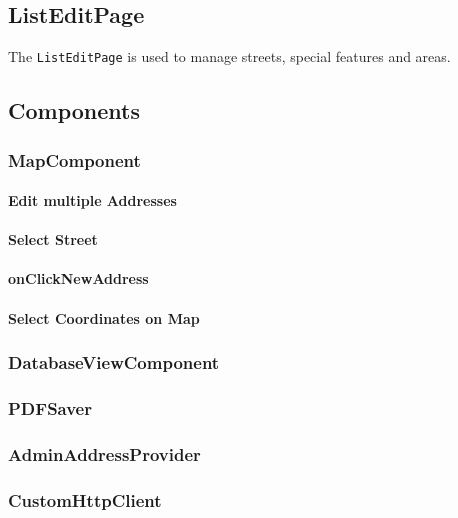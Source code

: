  

\subsection{ListEditPage}
The \texttt{ListEditPage} is used to manage streets, special features and areas. 

\subsection{Components}


\subsubsection{MapComponent}


\paragraph{Edit multiple Addresses}

\label{fig:Select Street}
\paragraph{Select Street}

\paragraph{onClickNewAddress}

\paragraph{Select Coordinates on Map}


\subsubsection{DatabaseViewComponent}

\subsubsection{PDFSaver}

\subsubsection{AdminAddressProvider}

\subsubsection{CustomHttpClient}

